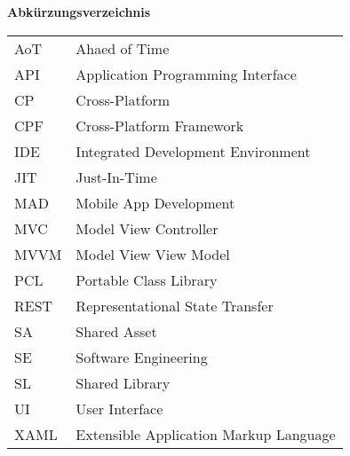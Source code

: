%
%
% 
% 

\begin{center}
{\Large\bfseries Abkürzungsverzeichnis}
\end{center}

\begin{table*}[htbp]
		\begin{tabular}{ll}
			AoT &	Ahaed of Time\\
			API &	Application Programming Interface\\
			CP  &	Cross-Platform \\
			CPF &	Cross-Platform Framework \\
			IDE	&	Integrated Development Environment\\
			JIT &	Just-In-Time \\
			MAD &	Mobile App Development \\
			MVC &	Model View Controller\\
			MVVM&	Model View View Model\\
			PCL	&	Portable Class Library\\
			REST&	Representational State Transfer\\
			SA 	&	Shared Asset\\
			SE	&	Software Engineering\\
			SL	&	Shared Library\\
			UI	&	User Interface\\
			XAML&	Extensible Application Markup Language\\
		\end{tabular}
\end{table*}